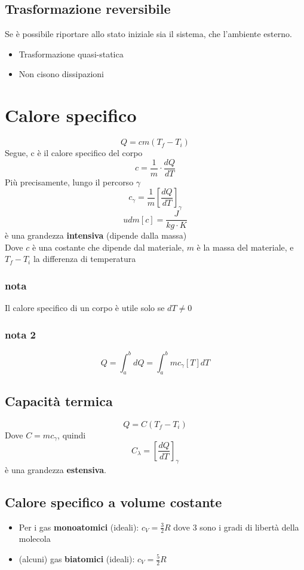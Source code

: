 \documentclass[a4paper]{report}
\begin{document}
  \subsection{Trasformazione reversibile}
  Se è possibile riportare allo stato iniziale sia il sistema, che l'ambiente esterno.
  \begin{itemize}
    \item Trasformazione quasi-statica
    \item Non cisono dissipazioni
  \end{itemize}

  \section{Calore specifico}
  \[ Q = cm(T_f - T_i) \]
  Segue, c è il calore specifico del corpo
  \[ c = \frac{1}{m} \cdot \frac{dQ}{dT} \]
  Più precisamente, lungo il percorso $\gamma$
  \[ c_\gamma = \frac{1}{m} [\frac{dQ}{dT}]_\gamma \]
  \[ udm[c] = \frac{J}{kg\cdot K} \]
  è una grandezza \textbf{intensiva} (dipende dalla massa)\\
  Dove $c$ è una costante che dipende dal materiale, $m$ è la massa del materiale, e $T_f - T_i$ la differenza di temperatura
  \subsubsection{nota}
  Il calore specifico di un corpo è utile solo se $dT \neq 0$
  \subsubsection{nota 2}
  \[ Q = \int_{a}^b dQ = \int_a^b m c_\gamma[T] dT \]
  \subsection{Capacità termica}
  \[ Q = C(T_f-T_i) \]
  Dove $C = mc_\gamma$, quindi
  \[ C_\lambda = [\frac{dQ}{dT}]_\gamma \]
  è una grandezza \textbf{estensiva}.
  \subsection{Calore specifico a volume costante}
  \begin{itemize}
    \item Per i gas \textbf{monoatomici} (ideali):  $c_V = \frac{3}{2}R$ dove $3$ sono i gradi di libertà della molecola
    \item (alcuni) gas \textbf{biatomici} (ideali):  $c_V = \frac{5}{2}R$
  \end{itemize}
\end{document}
